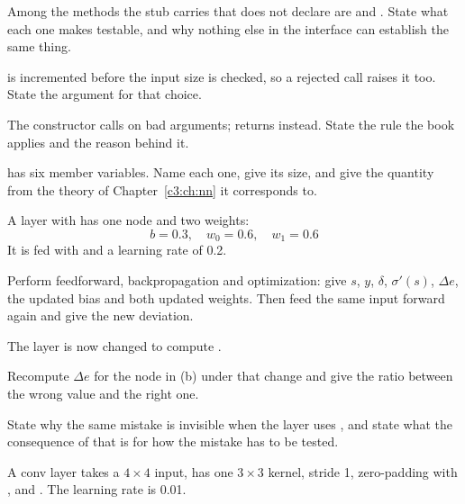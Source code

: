  Among the methods the stub carries that  does not declare
are  and . State what each one makes testable, and why
nothing else in the interface can establish the same thing.

 is incremented before the input size is checked, so a rejected call
raises it too. State the argument for that choice. 

 The constructor calls  on bad arguments;  returns
 instead. State the rule the book applies and the reason behind it. 

\label{exb:q:5}

  has six member variables. Name each one, give its size, and give the
quantity from the theory of Chapter~\ref{c3:ch:nn} it corresponds to. 

 A  layer with  has one node and two weights:
\[
  b = 0.3, \quad w_0 = 0.6, \quad w_1 = 0.6
\]
It is fed  with  and a learning rate of 0.2.

Perform feedforward, backpropagation and optimization: give $s$, $y$, $\delta$, $\sigma'(s)$,
$\Delta e$, the updated bias and both updated weights. Then feed the same input forward again and
give the new deviation. 

 The layer is now changed to compute
.

Recompute $\Delta e$ for the node in (b) under that change and give the ratio between the wrong
value and the right one.

State why the same mistake is invisible when the layer uses , and state what the
consequence of that is for how the mistake has to be tested. 

\label{exb:q:6}
A conv layer takes a $4 \times 4$ input, has one $3 \times 3$ kernel, stride 1, zero-padding with
, and . The learning rate is 0.01.

